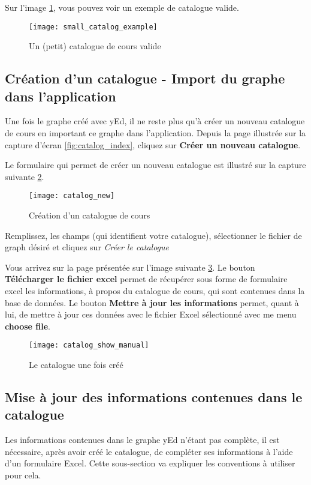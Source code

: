 Sur l'image \ref{fig:small_catalog_example}, vous pouvez voir un exemple de catalogue valide.

\begin{figure}[htb]
\centering
\texttt{[image: small\_catalog\_example]}
\label{fig:small_catalog_example}
\caption{Un (petit) catalogue de cours valide}

\end{figure}



\subsection{Création d'un catalogue - Import du graphe dans l'application}
Une fois le graphe créé avec yEd, il ne reste plus qu'à créer un nouveau catalogue de cours en important ce graphe dans l'application. Depuis la page illustrée sur la capture d'écran \ref{fig:catalog_index}, cliquez sur \textbf{Créer un nouveau catalogue}.

Le formulaire qui permet de créer un nouveau catalogue est illustré sur la capture suivante \ref{fig:catalog_new}.

\begin{figure}[htb]
\centering
\caption{Création d'un catalogue de cours}
\label{fig:catalog_new}
\texttt{[image: catalog\_new]}
\end{figure}

Remplissez, les champs (qui identifient votre catalogue), sélectionner le fichier de graph désiré et cliquez sur \textit{Créer le catalogue}

Vous arrivez sur la page présentée sur l'image suivante \ref{fig:catalog_show_manual}. Le bouton \textbf{Télécharger le fichier excel} permet de récupérer sous forme de formulaire excel les informations, à propos du catalogue de cours, qui sont contenues dans la base de données. Le bouton \textbf{Mettre à jour les informations} permet, quant à lui, de mettre à jour ces données avec le fichier Excel sélectionné avec me menu \textbf{choose file}.

\begin{figure}[htb]
\centering
\caption{Le catalogue une fois créé}
\label{fig:catalog_show_manual}
\texttt{[image: catalog\_show\_manual]}
\end{figure}

\subsection{Mise à jour des informations contenues dans le catalogue}
Les informations contenues dans le graphe yEd n'étant pas complète, il est nécessaire, après avoir créé le catalogue, de compléter ses informations à l'aide d'un formulaire Excel. Cette sous-section va expliquer les conventions à utiliser pour cela.

